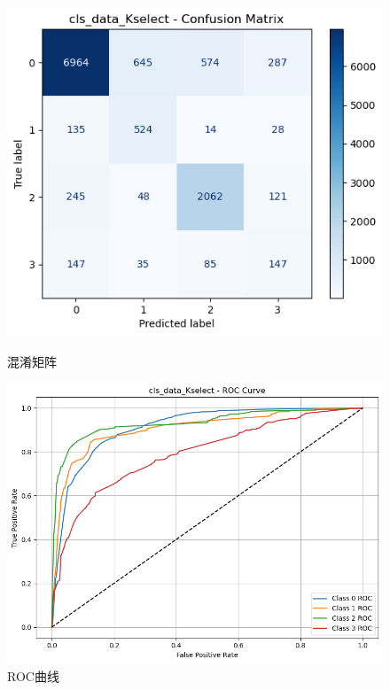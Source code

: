 \documentclass[10pt]{article}
\begin{document}
\begin{figure}[H]
\centering
\begin{minipage}[t]{0.45\textwidth}
  \centering
  \includegraphics[width=\linewidth]{cls_nb_10s.png}
  \caption{混淆矩阵}
  \label{fig:57}
\end{minipage}
\hfill
\begin{minipage}[t]{0.52\textwidth}
  \centering
  \includegraphics[width=\linewidth]{cls_nb_10s2.png}
  \caption{ROC曲线}
  \label{fig:58}
\end{minipage}
\end{figure}
\end{document}
